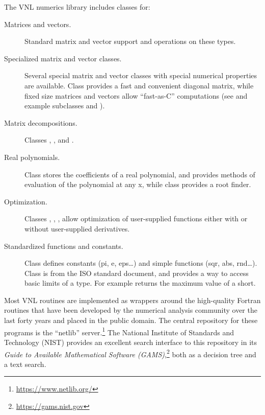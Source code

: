 The VNL numerics library includes classes for:
\begin{description}
    \item[Matrices and vectors.] Standard matrix and vector support
    and operations on these types.

    \item[Specialized matrix and vector classes.] Several special matrix
    and vector classes with special numerical properties are
    available. Class  provides a fast and
    convenient diagonal matrix, while fixed size matrices and vectors
    allow ``fast-as-C'' computations (see 
    and example subclasses  and
    ).

    \item[Matrix decompositions.] Classes ,
    , and
    .

    \item[Real polynomials.] Class  stores
    the coefficients of a real polynomial, and provides methods of
    evaluation of the polynomial at any x, while class
     provides a root finder.

    \item[Optimization.] Classes ,
    , ,
     allow optimization of user-supplied
    functions either with or without user-supplied derivatives.

    \item[Standardized functions and constants.] Class 
    defines constants (pi, e, eps\ldots) and simple functions (sqr, abs,
    rnd\ldots). Class  is from the ISO standard
    document, and provides a way to access basic limits of a
    type. For example  returns the maximum
    value of a short.
\end{description}

Most VNL routines are implemented as wrappers around the high-quality Fortran
routines that have been developed by the numerical analysis community over
the last forty years and placed in the public domain. The central repository
for these programs is the ``netlib'' server.\footnote{\url{https://www.netlib.org/}} The
National Institute of Standards and Technology (NIST) provides an excellent
search interface to this repository in its \emph{Guide to Available Mathematical
Software (GAMS)},\footnote{\url{https://gams.nist.gov}} both as a decision tree and a
text search.

